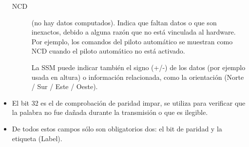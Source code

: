 \begin{itemize}
\begin{description}
    \item[NCD] (no hay datos computados). Indica que faltan datos o que son inexactos, debido a alguna razón que no está vinculada al hardware. Por ejemplo, los comandos del piloto automático se muestran como NCD cuando el piloto automático no está activado.

    La SSM puede indicar también el signo (+/-) de los datos (por ejemplo usada en altura) o información relacionada, como la orientación (Norte / Sur / Este / Oeste).
  \end{description}
  
  \item El bit 32 es el de comprobación de paridad impar, se utiliza para
    verificar que la palabra no fue dañada durante la transmisión o
    que es ilegible.



\item De  todos  estos  campos  sólo  son obligatorios  dos:  el  bit  de  paridad  y  la etiqueta (Label).
  \end{itemize}







